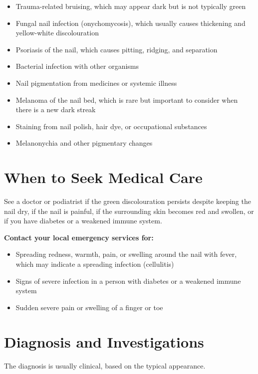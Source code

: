 \begin{itemize}
    \item Trauma-related bruising, which may appear dark but is not typically green
    \item Fungal nail infection (onychomycosis), which usually causes thickening and yellow-white discolouration
    \item Psoriasis of the nail, which causes pitting, ridging, and separation
    \item Bacterial infection with other organisms
    \item Nail pigmentation from medicines or systemic illness
    \item Melanoma of the nail bed, which is rare but important to consider when there is a new dark streak
    \item Staining from nail polish, hair dye, or occupational substances
    \item Melanonychia and other pigmentary changes
\end{itemize}

\section*{When to Seek Medical Care}
See a doctor or podiatrist if the green discolouration persists despite keeping the nail dry, if the nail is painful, if the surrounding skin becomes red and swollen, or if you have diabetes or a weakened immune system.

\textbf{Contact your local emergency services for:}
\begin{itemize}
    \item Spreading redness, warmth, pain, or swelling around the nail with fever, which may indicate a spreading infection (cellulitis)
    \item Signs of severe infection in a person with diabetes or a weakened immune system
    \item Sudden severe pain or swelling of a finger or toe
\end{itemize}

\section*{Diagnosis and Investigations}
The diagnosis is usually clinical, based on the typical appearance.

